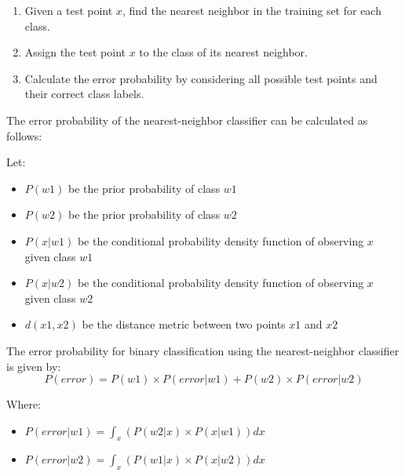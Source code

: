\begin{boxC}
    \begin{enumerate}
\item Given a test point $x$, find the nearest neighbor in the training set for each class.
\item Assign the test point $x$ to the class of its nearest neighbor.
\item Calculate the error probability by considering all possible test points and their correct class labels.
\end{enumerate}

The error probability of the nearest-neighbor classifier can be calculated as follows:

Let:
\begin{itemize}
\item $P(w1)$ be the prior probability of class $w1$
\item $P(w2)$ be the prior probability of class $w2$
\item $P(x | w1)$ be the conditional probability density function of observing $x$ given class $w1$
\item $P(x | w2)$ be the conditional probability density function of observing $x$ given class $w2$
\item $d(x1, x2)$ be the distance metric between two points $x1$ and $x2$
\end{itemize}

The error probability for binary classification using the nearest-neighbor classifier is given by:
\[ P(error) = P(w1) \times P(error | w1) + P(w2) \times P(error | w2) \]

Where:
\begin{itemize}
\item $P(error | w1) = \int_{x} (P(w2 | x) \times P(x | w1)) dx$
\item $P(error | w2) = \int_{x} (P(w1 | x) \times P(x | w2)) dx$
\end{itemize}

\end{boxC}